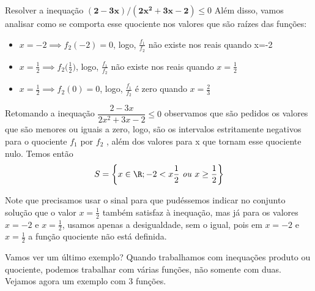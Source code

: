 \begin{example}{Resolver a inequação $\bm{(2-3x)/(2x^2+3x-2)}\leq0$}
Além disso, vamos analisar como se comporta esse quociente nos valores que são raízes das funções:

\begin{itemize}
\item $x=-2\implies f_2(-2)=0$, logo, $\frac{f_1}{f_2}$ não existe nos reais quando x=-2
\item $x=\frac{1}{2}\implies f_2\big(\frac{1}{2}\big)$, logo, $\frac{f_1}{f_2}$ não existe nos reais quando $x=\frac{1}{2}$
\item $x=\frac{1}{2}\implies f_2(0) = 0$, logo, $\frac{f_1}{f_2}$ é zero quando $x=\frac{2}{3}$
\end{itemize}

Retomando a inequação $\dfrac{2-3x}{2x^2+3x-2}\leq 0$ observamos que são pedidos os valores que são menores ou iguais a zero, logo, são os intervalos estritamente negativos para o quociente $f_1$ por $f_2$  , além dos valores para x que tornam esse quociente nulo. Temos então 
\begin{equation*}
S=\left\{x\in\R;-2<x\frac{1}{2}\text{ \textit{ou} }x\geq\frac{1}{2}\right\}
\end{equation*}
\end{example}

\begin{observation}
Note que precisamos usar o sinal   para que pudéssemos indicar no conjunto solução que o valor $x=\frac{1}{2}$ também satisfaz à inequação, mas já para os valores $x=-2$ e $x=\frac{1}{2}$, usamos apenas a desigualdade, sem o igual, pois em $x=-2$ e $x=\frac{1}{2}$ a função quociente não está definida.
\end{observation}

Vamos ver um  último exemplo? Quando trabalhamos com inequações produto ou quociente, podemos trabalhar com várias funções, não somente com duas. Vejamos agora um exemplo com $3$ funções.


